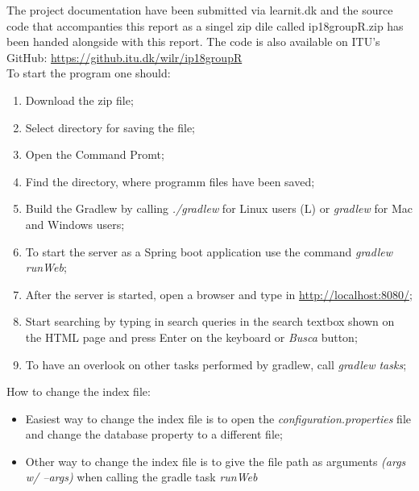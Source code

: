 The project documentation have been submitted via learnit.dk and the source code that accompanties this report as a singel zip dile called ip18groupR.zip has been handed alongside with this report.
The code is also available on ITU's GitHub: \url{https://github.itu.dk/wilr/ip18groupR}\\
To start the program one should:
\begin{enumerate}
    \item Download the zip file;
    \item Select directory for saving the file;
    \item Open the Command Promt;
    \item Find the directory, where programm files have been saved;
    \item Build the Gradlew by calling  \textit{./gradlew} for Linux users (L) or \textit{gradlew} for Mac and Windows users;
    \item To start the server as a  Spring boot application use the command \textit{gradlew runWeb};
    \item After the server is started, open a browser and type in \url{http://localhost:8080/};
    \item Start searching by typing in search queries in the search textbox shown on the HTML page and press Enter on the keyboard or \textit{Busca} button;
    \item To have an overlook on other tasks performed by gradlew, call \textit{gradlew tasks};
\end{enumerate}

How to change the index file:
\begin{itemize}
    \item Easiest way to change the index file is to open the \textit{configuration.properties} file and change the database property to a different file;
    \item Other way to change the index file is to give the file path as arguments \textit{(args w/ --args)} when calling the gradle task \textit{runWeb}
\end{itemize}

